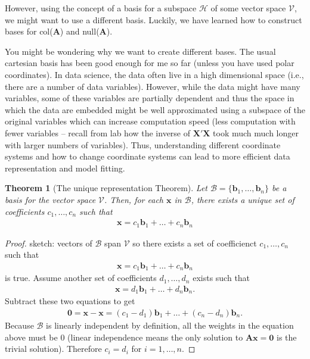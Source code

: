 \documentclass[
]{book}
\newtheorem{theorem}{Theorem}[chapter]
\theoremstyle{definition}
\theoremstyle{definition}
\theoremstyle{definition}
\theoremstyle{remark}
\begin{document}
However, using the concept of a basis for a subspace \(\mathcal{H}\) of some vector space \(\mathcal{V}\), we might want to use a different basis. Luckily, we have learned how to construct bases for col(\(\mathbf{A}\)) and null(\(\mathbf{A}\)).

You might be wondering why we want to create different bases. The usual cartesian basis has been good enough for me so far (unless you have used polar coordinates). In data science, the data often live in a high dimensional space (i.e., there are a number of data variables). However, while the data might have many variables, some of these variables are partially dependent and thus the space in which the data are embedded might be well approximated using a subspace of the original variables which can increase computation speed (less computation with fewer variables -- recall from lab how the inverse of \(\mathbf{X}'\mathbf{X}\) took much much longer with larger numbers of variables). Thus, understanding different coordinate systems and how to change coordinate systems can lead to more efficient data representation and model fitting.

\begin{theorem}[The unique representation Theorem]
\protect\hypertarget{thm:unnamed-chunk-233}{}{\label{thm:unnamed-chunk-233} {} }Let \(\mathcal{B} = \{ \mathbf{b}_1, \ldots, \mathbf{b}_n \}\) be a basis for the vector space \(\mathcal{V}\). Then, for each \(\mathbf{x}\) in \(\mathcal{B}\), there exists a unique set of coefficients \(c_1, \ldots, c_n\) such that
\[
\begin{aligned}
\mathbf{x} = c_1 \mathbf{b}_1 + \ldots + c_n \mathbf{b}_n
\end{aligned}
\]
\end{theorem}

\begin{proof}
{}sketch: vectors of \(\mathcal{B}\) span \(\mathcal{V}\) so there exists a set of coefficienct \(c_1, \ldots, c_n\) such that
\[
\begin{aligned}
\mathbf{x} = c_1 \mathbf{b}_1 + \ldots + c_n \mathbf{b}_n
\end{aligned}
\]
is true. Assume another set of coefficients \(d_1, \ldots, d_n\) exists such that
\[
\begin{aligned}
\mathbf{x} = d_1 \mathbf{b}_1 + \ldots + d_n \mathbf{b}_n.
\end{aligned}
\]
Subtract these two equations to get
\[
\begin{aligned}
\mathbf{0} = \mathbf{x} - \mathbf{x} = (c_1 - d_1) \mathbf{b}_1 + \ldots + (c_n - d_n) \mathbf{b}_n.
\end{aligned}
\]
Because \(\mathcal{B}\) is linearly independent by definition, all the weights in the equation above must be 0 (linear independence means the only solution to \(\mathbf{A}\mathbf{x} = \mathbf{0}\) is the trivial solution). Therefore \(c_i = d_i\) for \(i = 1, \ldots, n\).
\end{proof}
\end{document}
